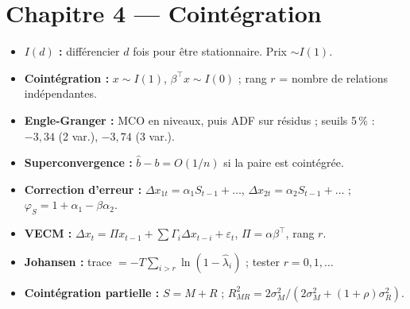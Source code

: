 \section*{Chapitre 4 — Cointégration}
\begin{itemize}[leftmargin=1.2em,itemsep=0.05em]
\item \textbf{$I(d)$ :} différencier $d$ fois pour être stationnaire. Prix $\sim I(1)$.
\item \textbf{Cointégration :} $x\sim I(1)$, $\beta^\top x\sim I(0)$ ; rang $r$ = nombre de relations indépendantes.
\item \textbf{Engle-Granger :} MCO en niveaux, puis ADF sur résidus ; seuils 5\,\% : $-3{,}34$ (2 var.), $-3{,}74$ (3 var.).
\item \textbf{Superconvergence :} $\hat b - b = O(1/n)$ si la paire est cointégrée.
\item \textbf{Correction d'erreur :} $\Delta x_{1t} = \alpha_1S_{t-1}+\dots$, $\Delta x_{2t} = \alpha_2S_{t-1}+\dots$ ; $\varphi_S = 1+\alpha_1-\beta\alpha_2$.
\item \textbf{VECM :} $\Delta x_t = \Pi x_{t-1} + \sum\Gamma_i\Delta x_{t-i} + \varepsilon_t$, $\Pi = \alpha\beta^\top$, rang $r$.
\item \textbf{Johansen :} trace $= -T\sum_{i>r}\ln(1-\hat\lambda_i)$ ; tester $r = 0, 1, \dots$
\item \textbf{Cointégration partielle :} $S = M + R$ ; $R^2_{MR} = 2\sigma_M^2/(2\sigma_M^2 + (1+\rho)\sigma_R^2)$.
\end{itemize}

